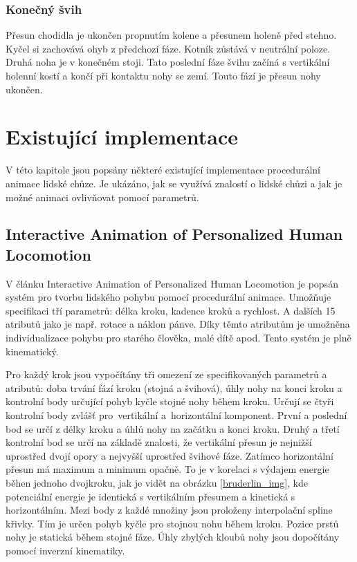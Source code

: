 \subsection{Konečný švih}
Přesun chodidla je ukončen propnutím kolene a přesunem holeně před stehno. Kyčel si zachovává ohyb z předchozí fáze. Kotník zůstává v neutrální poloze. Druhá noha je v konečném stoji. Tato poslední fáze švihu začíná s vertikální holenní kostí a končí při kontaktu nohy se zemí. Touto fází je přesun nohy ukončen.

\chapter{Existující implementace}
V této kapitole jsou popsány některé existující implementace procedurální animace lidské chůze. Je ukázáno, jak se využívá znalostí o lidské chůzi a jak je možné animaci ovlivňovat pomocí parametrů.

\section{Interactive Animation of Personalized Human Locomotion}
V článku Interactive Animation of Personalized Human Locomotion \cite{bruderlin} je popsán systém pro tvorbu lidského pohybu pomocí procedurální animace. Umožňuje specifikaci tří parametrů: délka kroku, kadence kroků a rychlost. A dalších 15 atributů jako je např. rotace a náklon pánve. Díky těmto atributům je umožněna individualizace pohybu pro starého člověka, malé dítě apod. Tento systém je plně kinematický. 

Pro každý krok jsou vypočítány tři omezení ze specifikovaných parametrů a atributů: doba trvání fází kroku (stojná a švihová), úhly nohy na konci kroku a kontrolní body určující pohyb kyčle stojné nohy během kroku. Určují se čtyři kontrolní body zvlášť pro~vertikální a~horizontální komponent. První a  poslední bod se určí z délky kroku a úhlů nohy na začátku a konci kroku. Druhý a třetí kontrolní bod se určí na základě znalosti, že vertikální přesun je nejnižší uprostřed dvojí opory a nejvyšší uprostřed švihové fáze. Zatímco horizontální přesun má maximum a minimum opačně. To je v korelaci s výdajem energie běhen jednoho dvojkroku, jak je vidět na obrázku \ref{bruderlin_img}, kde potenciální energie je identická s vertikálním přesunem a kinetická s horizontálním. Mezi body z každé množiny jsou proloženy interpolační spline křivky. Tím je určen pohyb kyčle pro stojnou nohu během kroku. Pozice prstů nohy je statická během stojné fáze. Úhly zbylých kloubů nohy jsou dopočítány pomocí inverzní kinematiky.

